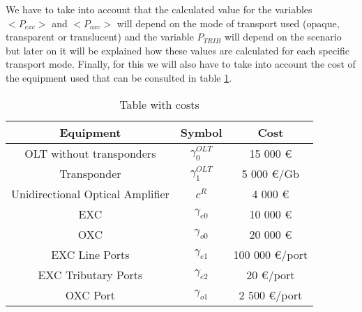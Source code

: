 \vspace{11pt}
We have to take into account that the calculated value for the variables $<P_{exc}>$ and $<P_{oxc}>$ will depend on the mode of transport used (opaque, transparent or translucent) and the variable $P_{TRIB}$ will depend on the scenario but later on it will be explained how these values are calculated for each specific transport mode.
Finally, for this we will also have to take into account the cost of the equipment used that can be consulted in table \ref{table_cost_analytical}.\\

\begin{table}[h!]
\centering
\begin{tabular}{|| c | c | c ||}
 \hline
 Equipment & Symbol & Cost \\
 \hline\hline
 OLT without transponders & $\gamma_0^{OLT}$ & 15 000 \euro \\
 Transponder & $\gamma_1^{OLT}$ & 5 000 \euro/Gb \\
 Unidirectional Optical Amplifier & $c^R$ & 4 000 \euro \\
 EXC & $\gamma_{e0}$ & 10 000 \euro \\
 OXC & $\gamma_{o0}$ & 20 000 \euro \\
 EXC Line Ports & $\gamma_{e1}$ & 100 000 \euro /port\\
 EXC Tributary Ports & $\gamma_{e2}$ & 20 \euro /port\\
 OXC Port & $\gamma_{o1}$ & 2 500 \euro /port \\
 \hline
\end{tabular}
\caption{Table with costs}
\label{table_cost_analytical}
\end{table}

